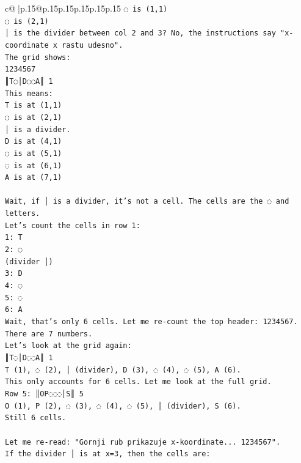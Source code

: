 \documentclass{article}
\begin{document}
{\begin{supertabular}{c@{$\;$}|p{.15\linewidth}@{}p{.15\linewidth}p{.15\linewidth}p{.15\linewidth}p{.15\linewidth}p{.15\linewidth}}
{{{\texttt{◌ is (1,1)} \\
\texttt{◌ is (2,1)} \\
\texttt{│ is the divider between col 2 and 3? No, the instructions say "x{-}coordinate x rastu udesno".} \\
\texttt{The grid shows:} \\
\texttt{1234567} \\
\texttt{║T◌│D◌◌A║ 1} \\
\texttt{This means:} \\
\texttt{T is at (1,1)} \\
\texttt{◌ is at (2,1)} \\
\texttt{│ is a divider.} \\
\texttt{D is at (4,1)} \\
\texttt{◌ is at (5,1)} \\
\texttt{◌ is at (6,1)} \\
\texttt{A is at (7,1)} \\
\\ 
\texttt{Wait, if │ is a divider, it's not a cell. The cells are the ◌ and letters.} \\
\texttt{Let's count the cells in row 1:} \\
\texttt{1: T} \\
\texttt{2: ◌} \\
\texttt{(divider │)} \\
\texttt{3: D} \\
\texttt{4: ◌} \\
\texttt{5: ◌} \\
\texttt{6: A} \\
\texttt{Wait, that's only 6 cells. Let me re{-}count the top header: 1234567. There are 7 numbers.} \\
\texttt{Let's look at the grid again:} \\
\texttt{║T◌│D◌◌A║ 1} \\
\texttt{T (1), ◌ (2), │ (divider), D (3), ◌ (4), ◌ (5), A (6).} \\
\texttt{This only accounts for 6 cells. Let me look at the full grid.} \\
\texttt{Row 5: ║OP◌◌◌│S║ 5} \\
\texttt{O (1), P (2), ◌ (3), ◌ (4), ◌ (5), │ (divider), S (6).} \\
\texttt{Still 6 cells.} \\
\\ 
\texttt{Let me re{-}read: "Gornji rub prikazuje x{-}koordinate... 1234567".} \\
\texttt{If the divider │ is at x=3, then the cells are:} \\
}}}
\end{supertabular}}
\end{document}
